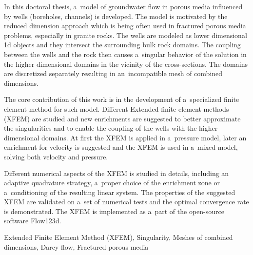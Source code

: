 \documentclass[bibliography=totocnumbered,dvipsnames,FM,Dis, EN]{tulthesis_autoreferat}
\begin{document}
\begin{abstractEN}
In this doctoral thesis, a~model of groundwater flow in porous media influenced by wells (boreholes, channels) is developed.
The model is motivated by the reduced dimension approach which is being often used in fractured porous media problems, especially in granite rocks.
The wells are modeled as lower dimensional 1d objects and they intersect the surrounding bulk rock domains.
The coupling between the wells and the rock then causes a~singular behavior of the solution in the higher dimensional domains
in the vicinity of the cross-sections. The domains are discretized separately resulting in an~incompatible mesh of combined dimensions.

The core contribution of this work is in the development of a~specialized finite element method for such model.
Different Extended finite element methods (XFEM) are studied and new enrichments are suggested to better
approximate the singularities and to enable the coupling of the wells with the higher dimensional domains.
At first the XFEM is applied in a~pressure model, later an enrichment for velocity
is suggested and the XFEM is used in a~mixed model, solving both velocity and pressure.

Different numerical aspects of the XFEM is studied in details, including an adaptive quadrature strategy,
a~proper choice of the enrichment zone or a~conditioning of the resulting linear system.
The properties of the suggested XFEM are validated on a~set of numerical tests and the optimal convergence
rate is demonstrated. The XFEM is implemented as a~part of the open-source software Flow123d.

\end{abstractEN}

\begin{keywordsEN}
Extended Finite Element Method (XFEM), Singularity, Meshes of combined dimensions,
Darcy flow, Fractured porous media
\end{keywordsEN}

\clearpage



\tableofcontents
\clearpage



% 
% 



\begingroup
\let\clearpage\relax
\listoffigures
\listoftables
\listofgraphs

\endgroup
\clearpage
\end{document}
